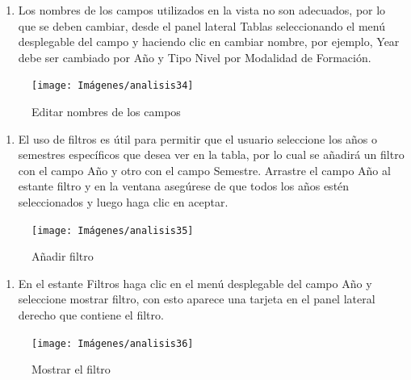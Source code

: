 \documentclass[
]{book}
\providecommand{\tightlist}{%
  \setlength{\itemsep}{0pt}\setlength{\parskip}{0pt}}
\begin{document}
\begin{enumerate}
\def\labelenumi{\arabic{enumi}.}
\setcounter{enumi}{4}
\tightlist
\item
  Los nombres de los campos utilizados en la vista no son adecuados, por lo que se deben cambiar, desde el panel lateral Tablas seleccionando el menú desplegable del campo y haciendo clic en cambiar nombre, por ejemplo, Year debe ser cambiado por Año y Tipo Nivel por Modalidad de Formación.
\end{enumerate}

\begin{figure}

{\centering \texttt{[image: Imágenes/analisis34]} 

}

\caption{Editar nombres de los campos}\label{fig:paso5tablatexto-fig}
\end{figure}

\begin{enumerate}
\def\labelenumi{\arabic{enumi}.}
\setcounter{enumi}{5}
\tightlist
\item
  El uso de filtros es útil para permitir que el usuario seleccione los años o semestres específicos que desea ver en la tabla, por lo cual se añadirá un filtro con el campo Año y otro con el campo Semestre. Arrastre el campo Año al estante filtro y en la ventana asegúrese de que todos los años estén seleccionados y luego haga clic en aceptar.
\end{enumerate}

\begin{figure}

{\centering \texttt{[image: Imágenes/analisis35]} 

}

\caption{Añadir filtro}\label{fig:paso6tablatexto-fig}
\end{figure}

\begin{enumerate}
\def\labelenumi{\arabic{enumi}.}
\setcounter{enumi}{6}
\tightlist
\item
  En el estante Filtros haga clic en el menú desplegable del campo Año y seleccione mostrar filtro, con esto aparece una tarjeta en el panel lateral derecho que contiene el filtro.
\end{enumerate}

\begin{figure}

{\centering \texttt{[image: Imágenes/analisis36]} 

}

\caption{Mostrar el filtro}\label{fig:paso7tablatexto-fig}
\end{figure}
\end{document}
